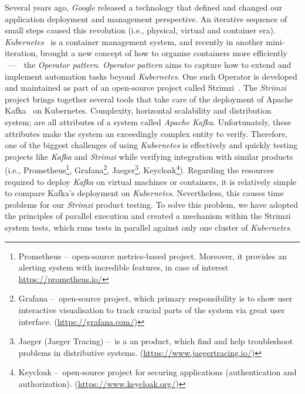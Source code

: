 Several years ago, \emph{Google} released a technology that defined and changed our application deployment and management perspective.
An iterative sequence of small steps caused this revolution (i.e., physical, virtual and container era).
\emph{Kubernetes}~\cite{history, kubernetes, kubernetesBook} is a container management system, and recently in another mini-iteration, brought a new concept of how to organise containers more efficiently \ --- \ the \emph{Operator pattern}.
\emph{Operator pattern} aims to capture how to extend and implement automation tasks beyond \emph{Kubernetes}.
One such Operator is developed and maintained as part of an open-source project called Strimzi~\cite{strimziDoc, strimziBlogPosts}.
The \emph{Strimzi} project brings together several tools that take care of the deployment of Apache Kafka~\cite{apacheKafkaDefinitiveGuide, apacheKafkaDesignDistributedSystems, kafkaStreamsBook, kafkaDocumentation} on Kubernetes.
Complexity, horizontal scalability and distribution system;
are all attributes of a system called \emph{Apache Kafka}.
Unfortunately, these attributes make the system an exceedingly complex entity to verify.
Therefore, one of the biggest challenges of using \emph{Kubernetes} is effectively and quickly testing projects like \emph{Kafka} and \emph{Strimzi} while verifying integration with similar products (i.e.,
Prometheus\footnote{Prometheus \---\ open-source metrics-based project. Moreover, it provides an alerting system with incredible features, in case of interest \url{https://prometheus.io/}},
Grafana\footnote{Grafana \---\ open-source project, which primary responsibility is to show user interactive visualisation to track crucial parts of the system via great user interface. (\url{https://grafana.com/})},
Jaeger\footnote{Jaeger (Jaeger Tracing) \---\ is a an product, which find and help troubleshoot problems in distributive systems. (\url{https://www.jaegertracing.io/})},
Keycloak\footnote{Keycloak \---\ open-source project for securing applications (authentication and authorization). (\url{https://www.keycloak.org/})}).
Regarding the resources required to deploy \emph{Kafka} on virtual machines or containers, it is relatively simple to compare Kafka's deployment on \emph{Kubernetes}.
Nevertheless, this causes time problems for our \emph{Strimzi} product testing.
To solve this problem, we have adopted the principles of parallel execution and created a mechanism within the Strimzi system tests, which runs tests in parallel against only one cluster of \emph{Kubernetes}.

